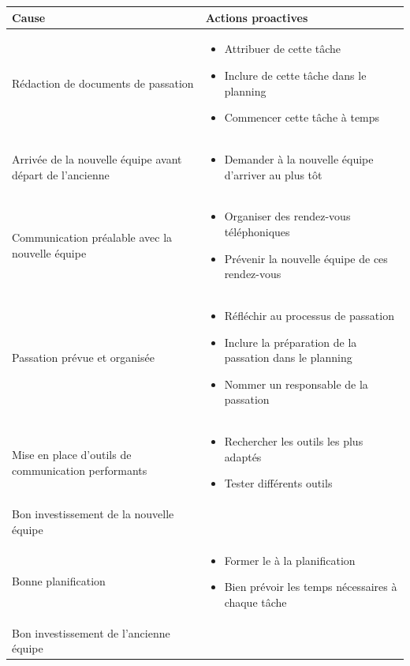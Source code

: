 \centering
	\begin{longtable}{|p{7cm}|p{7cm}|}
	\hline
	Cause & Actions proactives \\
	\hline
	 Rédaction de documents de passation & \begin{itemize}
	 	\item Attribuer de cette tâche
	 	\item Inclure de cette tâche dans le planning
	 	\item Commencer cette tâche à temps
	 \end{itemize} \\
	\hline
	Arrivée de la nouvelle équipe avant départ de l'ancienne & \begin{itemize}
		\item Demander à la nouvelle équipe d'arriver au plus tôt
	\end{itemize} \\
	\hline
	Communication préalable avec la nouvelle équipe & \begin{itemize}
		\item Organiser des rendez-vous téléphoniques
		\item Prévenir la nouvelle équipe de ces rendez-vous
	\end{itemize} \\
	\hline
	Passation prévue et organisée & \begin{itemize}
		\item Réfléchir au processus de passation
		\item Inclure la préparation de la passation dans le planning
		\item Nommer un responsable de la passation
	\end{itemize} \\
	\hline
	Mise en place d'outils de communication performants & \begin{itemize}
		\item Rechercher les outils les plus adaptés
		\item Tester différents outils
	\end{itemize} \\
	\hline
	Bon investissement de la nouvelle équipe & 
	 \\
	\hline
	Bonne planification & \begin{itemize}
		\item Former le \CP à la planification
		\item Bien prévoir les temps nécessaires à chaque tâche
	\end{itemize} \\
	\hline
	Bon investissement de l'ancienne équipe & 
	 \\
	\hline

	\end{longtable}

